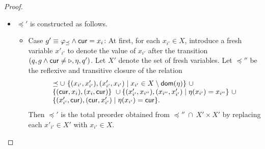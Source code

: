 \begin{appendix}
\begin{proof}
\begin{itemize}
\begin{itemize}
%
%
%
%
\item $\preceq'$ is constructed as follows.
\begin{itemize}
\item Case $g' \equiv \varphi_{\preceq} \wedge \mathsf{cur} = x_i$: At first, for each $x_{i'} \in X$, introduce a fresh variable $x'_{i'}$ to denote the value of $x_{i'}$ after the transition $(q, g \wedge \mathsf{cur} \neq \triangleright, \eta,q')$. Let $X'$ denote the set of fresh variables. Let $\preceq''$ be the reflexive and transitive closure of the relation
\[
\begin{array}{l}
\preceq \cup\ \{(x_{i'}, x'_{i'}), (x'_{i'}, x_{i'}) \mid x_{i'} \in X \setminus \mathsf{dom}(\eta)\}\ \cup\\
 \{(\mathsf{cur}, x_i), (x_i, \mathsf{cur})\}\ \cup   \{(x'_{i'}, x_{i''}), (x_{i''}, x'_{i'}) \mid \eta(x_{i'})=x_{i''}\}\  \cup \\
 \{(x'_{i'}, \mathsf{cur}), (\mathsf{cur}, x'_{i'}) \mid \eta(x_{i'}) = \mathsf{cur} \}.
\end{array}
\] 
Then $\preceq'$ is the total preorder obtained from $\preceq'' \ \cap\ X' \times X'$ by replacing each $x'_{i'} \in X'$ with $x_{i'} \in X$.


\end{itemize}
\end{itemize}
\end{itemize}
\end{proof}
\end{appendix}
